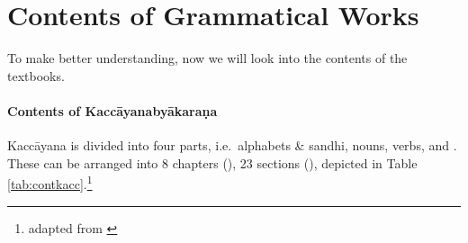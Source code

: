 \section*{Contents of Grammatical Works}

To make better understanding, now we will look into the contents of the textbooks.

\paragraph*{Contents of Kacc\=ayanaby\=akara\d na} Kacc\=ayana is divided into four parts, i.e.\ alphabets \& sandhi, nouns, verbs, and . These can be arranged into 8 chapters (), 23 sections (), depicted in Table \ref{tab:contkacc}.\footnote{adapted from \citealp[p.~28]{supaphan:pali}}

